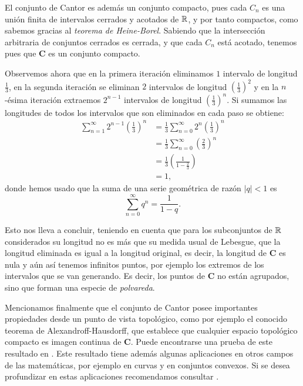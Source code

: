 El conjunto de Cantor es además un conjunto compacto, pues cada $C_n$ es una unión finita de intervalos cerrados y acotados de $\mathbb{R}$, y por tanto compactos, como sabemos gracias al \textit{teorema de Heine-Borel}. Sabiendo que la intersección arbitraria de conjuntos cerrados es cerrada, y que cada $C_n$ está acotado, tenemos pues que $\mathbf{C}$ es un conjunto compacto.

Observemos ahora que en la primera iteración eliminamos $1$ intervalo de longitud $\frac 1 3$, en la segunda iteración se eliminan $2$ intervalos de longitud $\left(\frac{1}{3}\right)^2$ y en la $n$-ésima iteración extraemos $2^{n-1}$ intervalos de longitud $\left(\frac{1}{3}\right)^n$. Si sumamos las longitudes de todos los intervalos que son eliminados en cada paso se obtiene:
\begin{equation*}
  \begin{split}
    \sum_{n=1}^\infty 2^{n-1}\left(\frac 1 3\right)^n  &= \frac 1 3  \sum_{n=0}^\infty 2^n\left(\frac 1 3\right)^n \\
    &=  \frac 1 3  \sum_{n=0}^\infty \left(\frac 2 3\right)^n \\
    &= \frac{1}{3} \left(\frac{1}{1-\frac{2}{3}}\right) \\
    &= 1,
  \end{split}
\end{equation*}
donde hemos usado que la suma de una serie geométrica de razón $|q|<1$ es $$\sum_{n=0}^\infty q^n = \frac{1}{1-q}.$$

Esto nos lleva a concluir, teniendo en cuenta que para los subconjuntos de $\mathbb{R}$ considerados su longitud no es más que su medida usual de Lebesgue, que la longitud eliminada es igual a la longitud original, es decir, la longitud de $\mathbf C$ es nula y aún así tenemos infinitos puntos, por ejemplo los extremos de los intervalos que se van generando. Es decir, los puntos de $\mathbf{C}$ no están agrupados, sino que forman una especie de \textit{polvareda}.

Mencionamos finalmente que el conjunto de Cantor posee importantes propiedades desde un punto de vista topológico, como por ejemplo el conocido teorema de Alexandroff-Hausdorff, que establece que cualquier espacio topológico compacto es imagen continua de $\mathbf C$. Puede encontrarse una prueba de este resultado en \cite{Dreher}. Este resultado tiene además algunas aplicaciones en otros campos de las matemáticas, por ejemplo en curvas y en conjuntos convexos. Si se desea profundizar en estas aplicaciones recomendamos consultar \cite{Benyamini}.

